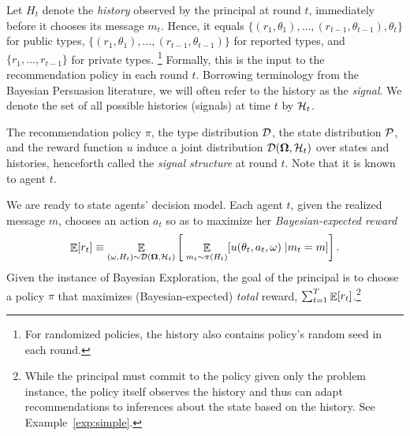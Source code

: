 

Let $H_t$ denote the \emph{history} observed by the principal at round $t$, immediately before it chooses its message $m_t$. Hence, it equals $\{(r_1,\theta_1),\ldots,(r_{t-1},\theta_{t-1}),\theta_t\}$ for public types, $\{(r_1,\theta_1),\ldots,(r_{t-1},\theta_{t-1})\}$ for reported types, and $\{r_1,\ldots,r_{t-1}\}$ for private types.%
\footnote{For randomized policies, the history also contains policy's random seed in each round.}
Formally, this is the input to the recommendation policy in each round $t$. Borrowing terminology from the Bayesian Persuasion literature, we will often refer to the history as the {\em signal}. We denote the set of all possible histories (signals) at time $t$ by $\mathcal{H}_t$.


The recommendation policy $\pi$, the type distribution $\mathcal{D}$, the state distribution $\mathcal{P}$, and the reward function $u$ induce a joint distribution $\mathcal{D}(\bold{\Omega},\mathcal{H}_t)$ over states and histories, henceforth called the {\em signal structure} at round $t$. Note that it is known to agent $t$.

We are ready to state agents' decision model. Each agent $t$, given the realized message $m$, chooses an action $a_t$ so as to maximize her {\em Bayesian-expected reward}
$$\mathop{\mathbb{E}}[r_t]\equiv\mathop{\mathbb{E}}_{(\omega,H_t)\sim\mathcal{D}(\bold{\Omega},\mathcal{H}_t)}
\left[\; \mathop{\mathbb{E}}_{m_t\sim\pi(H_t)}[u(\theta_t,a_t,\omega)\;|m_t = m ]\right].$$
Given the instance of Bayesian Exploration, the goal of the principal is to choose a policy $\pi$ that maximizes (Bayesian-expected) {\em total} reward, \ie $\sum_{t=1}^T \mathop{\mathbb{E}}[r_t]$.\footnote{While the principal must commit to the policy given only the problem instance, the policy itself observes the history and thus can adapt recommendations to inferences about the state based on the history.  See Example~\ref{exp:simple}.}

